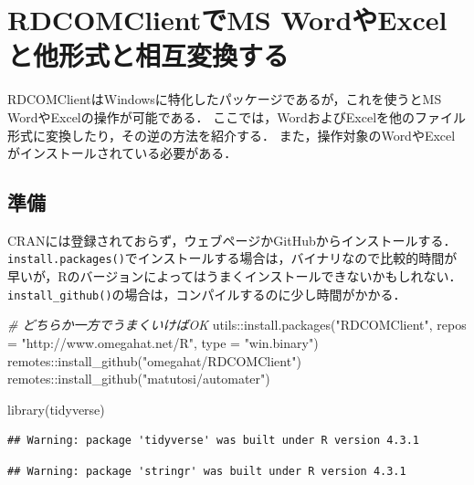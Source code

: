 \documentclass[
]{article}
\newenvironment{Shaded}{\begin{snugshade}}{\end{snugshade}}
\newcommand{\AttributeTok}[1]{\textcolor[rgb]{0.77,0.63,0.00}{#1}}
\newcommand{\CommentTok}[1]{\textcolor[rgb]{0.56,0.35,0.01}{\textit{#1}}}
\newcommand{\FunctionTok}[1]{\textcolor[rgb]{0.00,0.00,0.00}{#1}}
\newcommand{\NormalTok}[1]{#1}
\newcommand{\SpecialCharTok}[1]{\textcolor[rgb]{0.00,0.00,0.00}{#1}}
\newcommand{\StringTok}[1]{\textcolor[rgb]{0.31,0.60,0.02}{#1}}
\begin{document}
\hypertarget{RDCOMClient}{%
\section{RDCOMClientでMS WordやExcelと他形式と相互変換する}\label{RDCOMClient}}

RDCOMClientはWindowsに特化したパッケージであるが，これを使うとMS WordやExcelの操作が可能である．
ここでは，WordおよびExcelを他のファイル形式に変換したり，その逆の方法を紹介する．
また，操作対象のWordやExcelがインストールされている必要がある．

\hypertarget{ux6e96ux5099-16}{%
\subsection{準備}\label{ux6e96ux5099-16}}

CRANには登録されておらず，ウェブページかGitHubからインストールする．
\texttt{install.packages()}でインストールする場合は，バイナリなので比較的時間が早いが，Rのバージョンによってはうまくインストールできないかもしれない．
\texttt{install\_github()}の場合は，コンパイルするのに少し時間がかかる．

\begin{Shaded}
\begin{Highlighting}[]
  \CommentTok{\# どちらか一方でうまくいけばOK}
\NormalTok{utils}\SpecialCharTok{::}\FunctionTok{install.packages}\NormalTok{(}\StringTok{"RDCOMClient"}\NormalTok{, }\AttributeTok{repos =} \StringTok{"http://www.omegahat.net/R"}\NormalTok{, }\AttributeTok{type =} \StringTok{"win.binary"}\NormalTok{)}
\NormalTok{remotes}\SpecialCharTok{::}\FunctionTok{install\_github}\NormalTok{(}\StringTok{"omegahat/RDCOMClient"}\NormalTok{)}
\NormalTok{remotes}\SpecialCharTok{::}\FunctionTok{install\_github}\NormalTok{(}\StringTok{"matutosi/automater"}\NormalTok{)}
\end{Highlighting}
\end{Shaded}

\begin{Shaded}
\begin{Highlighting}[]
\FunctionTok{library}\NormalTok{(tidyverse)}
\end{Highlighting}
\end{Shaded}

\begin{verbatim}
## Warning: package 'tidyverse' was built under R version 4.3.1
\end{verbatim}

\begin{verbatim}
## Warning: package 'stringr' was built under R version 4.3.1
\end{verbatim}
\end{document}
